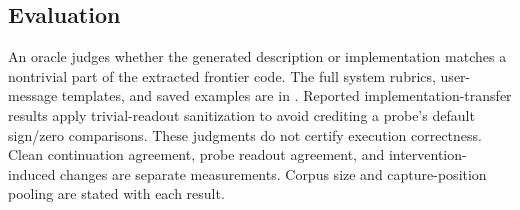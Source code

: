 \subsection{Evaluation}
An oracle judges whether the generated description or implementation matches a nontrivial part of the extracted frontier code. The full system rubrics, user-message templates, and saved examples are in . Reported implementation-transfer results apply trivial-readout sanitization to avoid crediting a probe's default sign/zero comparisons. These judgments do not certify execution correctness. Clean continuation agreement, probe readout agreement, and intervention-induced changes are separate measurements. Corpus size and capture-position pooling are stated with each result.
